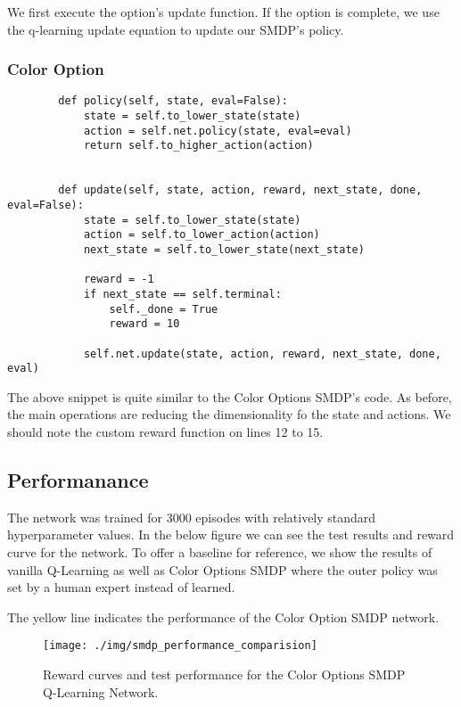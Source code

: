 \documentclass[A4]{article}
\begin{document}
    We first execute the option's update function.
    If the option is complete, we use the q-learning update equation to update our SMDP's policy.

    \subsubsection{Color Option}
    \begin{verbatim}
        def policy(self, state, eval=False):
            state = self.to_lower_state(state)
            action = self.net.policy(state, eval=eval)
            return self.to_higher_action(action)


        def update(self, state, action, reward, next_state, done, eval=False):
            state = self.to_lower_state(state)
            action = self.to_lower_action(action)
            next_state = self.to_lower_state(next_state)

            reward = -1
            if next_state == self.terminal:
                self._done = True
                reward = 10

            self.net.update(state, action, reward, next_state, done, eval)
    \end{verbatim}

    The above snippet is quite similar to the Color Options SMDP's code.
    As before, the main operations are reducing the dimensionality fo the state and actions.
    We should note the custom reward function on lines 12 to 15.

    \subsection{Performanance}
    The network was trained for 3000 episodes with relatively standard hyperparameter values.
    In the below figure we can see the test results and reward curve for the network.
    To offer a baseline for reference, we show the results of vanilla Q-Learning
    as well as Color Options SMDP where the outer policy was set by a human expert instead of learned.

    The yellow line indicates the performance of the Color Option SMDP network.

    \begin{figure}[H]
        \centering
        \texttt{[image: ./img/smdp\_performance\_comparision]}
        \caption{Reward curves and test performance for the Color Options SMDP Q-Learning Network.}
        \label{fig:smdp_performance_comparision}
    \end{figure}
\end{document}
